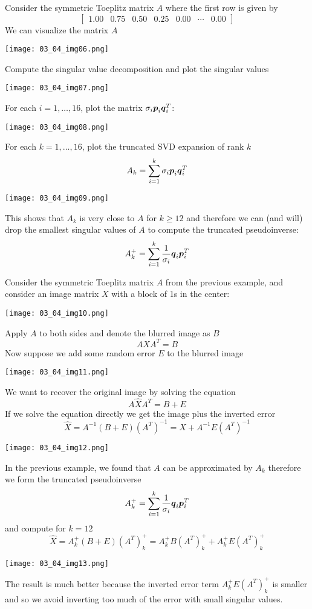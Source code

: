 \begin{example}
Consider the symmetric Toeplitz matrix $A$ where the first row is given by
$$
\begin{bmatrix}
1.00 & 0.75 & 0.50 & 0.25 & 0.00 & \cdots & 0.00
\end{bmatrix}
$$
We can visualize the matrix $A$
\begin{center}
\texttt{[image: 03\_04\_img06.png]}
\end{center}
Compute the singular value decomposition and plot the singular values
\begin{center}
\texttt{[image: 03\_04\_img07.png]}
\end{center}
For each $i=1,\dots,16$, plot the matrix $\sigma_i \boldsymbol{p}_i \boldsymbol{q}_i^T$:
\begin{center}
\texttt{[image: 03\_04\_img08.png]}
\end{center}
For each $k=1,\dots,16$, plot the truncated SVD expansion of rank $k$
$$
A_k = \sum_{i=1}^k \sigma_i \boldsymbol{p}_i \boldsymbol{q}_i^T
$$
\begin{center}
\texttt{[image: 03\_04\_img09.png]}
\end{center}
This shows that $A_k$ is very close to $A$ for $k \geq 12$ and therefore we can (and will) drop the smallest singular values of $A$ to compute the truncated pseudoinverse:
$$
A_k^+ = \sum_{i=1}^k \frac{1}{\sigma_i} \boldsymbol{q}_i \boldsymbol{p}_i^T
$$
\end{example}

\begin{example}
Consider the symmetric Toeplitz matrix $A$ from the previous example, and consider an image matrix $X$ with a block of 1s in the center:
\begin{center}
\texttt{[image: 03\_04\_img10.png]}
\end{center}
Apply $A$ to both sides and denote the blurred image as $B$
$$
AXA^T = B
$$
Now suppose we add some random error $E$ to the blurred image
\begin{center}
\texttt{[image: 03\_04\_img11.png]}
\end{center}
We want to recover the original image by solving the equation
$$
A\hat{X}A^T = B + E
$$
If we solve the equation directly we get the image plus the inverted error
$$
\hat{X} = A^{-1}( B + E )(A^T)^{-1} = X + A^{-1} E (A^T)^{-1}
$$
\begin{center}
\texttt{[image: 03\_04\_img12.png]}
\end{center}
In the previous example, we found that $A$ can be approximated by $A_k$ therefore we form the truncated pseudoinverse
$$
A_k^+ = \sum_{i=1}^k \frac{1}{\sigma_i} \boldsymbol{q}_i \boldsymbol{p}_i^T
$$
and compute for $k=12$
$$
\hat{X} = A_k^+(B +  E) (A^T)_k^+ = A_k^+B(A^T)_k^+ + A_k^+ E (A^T)_k^+
$$
\begin{center}
\texttt{[image: 03\_04\_img13.png]}
\end{center}
The result is much better because the inverted error term $A_k^+ E (A^T)_k^+$ is smaller and so we avoid inverting too much of the error with small singular values.
\end{example}

